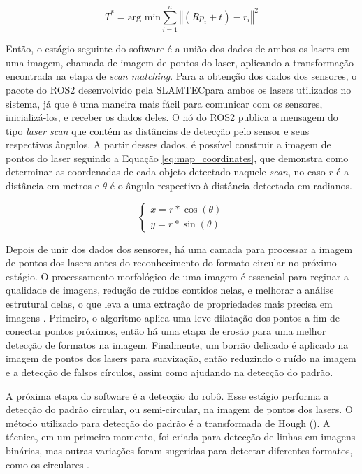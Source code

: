 \documentclass[acronym, symbols, table]{fei}
\begin{document}
				\begin{equation} \label{eq:scan_matching}
					T^* = \text{arg min} \sum_{i=1}^{n}\left\Vert (Rp_i + t) - r_i \right\Vert^2
				\end{equation}
			
				Então, o estágio seguinte do software é a união dos dados de ambos os lasers em uma imagem, chamada de imagem de pontos do laser, aplicando a transformação encontrada na etapa de \textit{scan matching}. Para a obtenção dos dados dos sensores, o pacote do ROS2 desenvolvido pela SLAMTEC\textregistered para ambos os lasers utilizados no sistema, já que é uma maneira mais fácil para comunicar com os sensores, inicializá-los, e receber os dados deles. O nó do ROS2 publica a mensagem do tipo \textit{laser scan} que contém as distâncias de detecção pelo sensor e seus respectivos ângulos. A partir desses dados, é possível construir a imagem de pontos do laser seguindo a Equação \eqref{eq:map_coordinates}, que demonstra como determinar as coordenadas de cada objeto detectado naquele \textit{scan}, no caso $r$ é a distância em metros e $\theta$ é o ângulo respectivo à distância detectada em radianos.
				
				\begin{equation}\label{eq:map_coordinates}
					\begin{cases}
						x = r * \cos(\theta) \\
						y = r * \sin(\theta)
					\end{cases}
				\end{equation}
			
				Depois de unir dos dados dos sensores, há uma camada para processar a imagem de pontos dos lasers antes do reconhecimento do formato circular no próximo estágio. O processamento morfológico de uma imagem é essencial para reginar a qualidade de imagens, redução de ruídos contidos nelas, e melhorar a análise estrutural delas, o que leva a uma extração de propriedades mais precisa em imagens \cite{lotufo2023morphological}. Primeiro, o algoritmo aplica uma leve dilatação dos pontos a fim de conectar pontos próximos, então há uma etapa de erosão para uma melhor detecção de formatos na imagem. Finalmente, um borrão delicado é aplicado na imagem de pontos dos lasers para suavização, então reduzindo o ruído na imagem e a detecção de falsos círculos, assim como ajudando na detecção do padrão.
			
				A próxima etapa do software é a detecção do robô. Esse estágio performa a detecção do padrão circular, ou semi-circular, na imagem de pontos dos lasers. O método utilizado para detecção do padrão é a transformada de Hough (). A técnica, em um primeiro momento, foi criada para detecção de linhas em imagens binárias, mas outras variações foram sugeridas para detectar diferentes formatos, como os circulares \cite{mukhopadhyay2015survey}.
				
\end{document}
